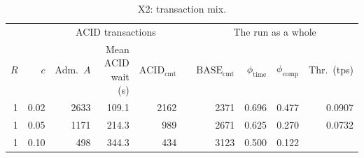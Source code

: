 \begin{table}[!htb]
  \centering
  \captionsetup{format=plain,justification=centering}
  \caption{X2: transaction mix.}
  \label{tab:blocking}
  \small
  \setlength{\tabcolsep}{3pt}
  \begin{tabular}{r r r r r c r r r r}
    \toprule
                                              &
                                              &
    \multicolumn{3}{c}{ACID
      transactions}
                                              &
                                              &
    \multicolumn{4}{c}{The
      run
      as
      a
      whole}
    \\
    \cmidrule(lr){3-5}\cmidrule(lr){7-10} $R$ & $c$
                                              & Adm.\ $A$                      & \shortstack{Mean
                                                                                   ACID\\wait (s)} &
    $\mathrm{ACID}_{\mathrm{cmt}}$            &
                                              & $\mathrm{BASE}_{\mathrm{cmt}}$ &
    $\phi_{\mathrm{time}}$                    &
    $\phi_{\mathrm{comp}}$
                                              & Thr.\ (tps)
    \\
    \midrule
    1                                         & 0.02
                                              & 2633                           &
    109.1                                     & 2162
                                              &                                &
    2371                                      & 0.696
                                              & 0.477                          &
    0.0907
    \\
    1                                         & 0.05
                                              & 1171                           &
    214.3                                     & 989
                                              &                                &
    2671                                      & 0.625
                                              & 0.270                          &
    0.0732
    \\
    1                                         & 0.10
                                              & 498                            &
    344.3                                     & 434
                                              &                                &
    3123                                      & 0.500
                                              & 0.122                          &

\end{tabular}
\end{table}
